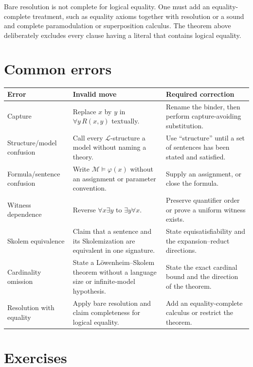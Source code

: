 \documentclass[11pt,oneside,openany]{book}
\theoremstyle{definition}
\theoremstyle{plain}
\theoremstyle{remark}
\newcommand{\Lang}{\mathcal{L}}
\newcommand{\Meta}{\mathcal{M}}
\newcommand{\entails}{\models}
\begin{document}
Bare resolution is not complete for logical equality.  One must add
an equality-complete treatment, such as equality axioms together with
resolution or a sound and complete paramodulation or superposition calculus.
The theorem above deliberately excludes every clause having a literal that
contains logical equality.

\section{Common errors}
\label{sec:fol-cardinality-normalforms-05}

\begin{longtable}{@{}p{}p{}p{}@{}}
\toprule
Error & Invalid move & Required correction \\ \midrule
\endhead
Capture & Replace \(x\) by \(y\) in \(\forall y\,R(x,y)\) textually. &
Rename the binder, then perform capture-avoiding substitution. \\
\addlinespace
Structure/model confusion & Call every \(\Lang\)-structure a model without
naming a theory. & Use ``structure'' until a set of sentences has been stated
and satisfied. \\
\addlinespace
Formula/sentence confusion & Write \(\Meta\entails\varphi(x)\) without an
assignment or parameter convention. & Supply an assignment, or close the
formula. \\
\addlinespace
Witness dependence & Reverse \(\forall x\exists y\) to
\(\exists y\forall x\). & Preserve quantifier order or prove a uniform witness
exists. \\
\addlinespace
Skolem equivalence & Claim that a sentence and its Skolemization are
equivalent in one signature. & State equisatisfiability and the
expansion--reduct directions. \\
\addlinespace
Cardinality omission & State a L\"owenheim--Skolem theorem without a language
size or infinite-model hypothesis. & State the exact cardinal bound and the
direction of the theorem. \\
\addlinespace
Resolution with equality & Apply bare resolution and claim completeness for
logical equality. & Add an equality-complete calculus or restrict the theorem.
\\
\bottomrule
\end{longtable}

\section{Exercises}
\label{sec:fol-cardinality-normalforms-06}
\end{document}
